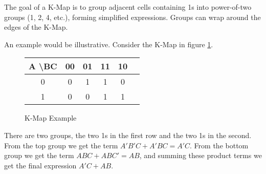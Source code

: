 The goal of a K-Map is to group adjacent cells containing
1s into power-of-two groups (1, 2, 4, etc.), forming simplified expressions.
Groups can wrap around the edges of the K-Map.

An example would be illustrative. Consider the K-Map
in figure \ref{fig:kmapexample}.
\begin{center}
    \begin{figure}
        \begin{center}
            \begin{tabular}{|c|c|c|c|c|c|}
                \hline
                A \textbackslash BC & 00 & 01 & 11 & 10 \\
                \hline
                0                   & 0  & 1  & 1  & 0  \\
                \hline
                1                   & 0  & 0  & 1  & 1  \\
                \hline
            \end{tabular}
        \end{center}
        \caption{K-Map Example}
        \label{fig:kmapexample}
    \end{figure}
\end{center}
There are two groups, the two 1s in the first row
and the two 1s in the second. From the top group
we get the term $A'B'C + A'BC = A'C$. From the bottom group we
get the term $ABC + ABC' = AB$, and summing these product terms
we get the final expression $A'C + AB$.
